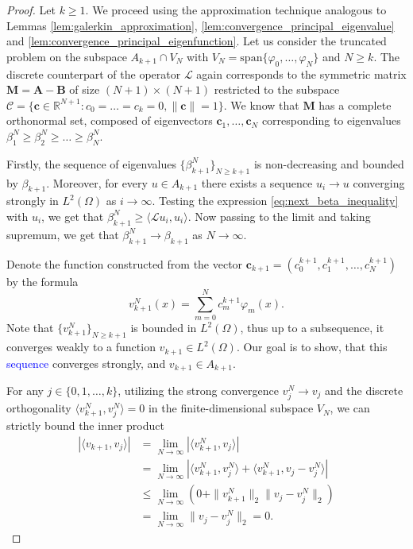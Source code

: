 \documentclass[12pt, a4paper]{article}
\newcommand{\revision}[1]{\textcolor{blue}{#1}}
\theoremstyle{break}
\theoremstyle{break}
\theoremstyle{break}
\theoremstyle{break}
\theoremstyle{break}
\theoremstyle{break}
\theoremstyle{break}
\theoremstyle{break}
\theoremstyle{break}
\begin{document}
\begin{proof}
    Let $k \geq 1$. We proceed using the approximation technique analogous to Lemmas \ref{lem:galerkin_approximation}, \ref{lem:convergence_principal_eigenvalue} and \ref{lem:convergence_principal_eigenfunction}. Let us consider the truncated problem on the subspace $A_{k+1} \cap V_N$ with $V_N = \text{span}\{\varphi_0, \ldots, \varphi_N\}$ and $N \geq k$. The discrete counterpart of the operator $\mathcal{L}$ again corresponds to the symmetric matrix $\mathbf{M} = \mathbf{A} - \mathbf{B}$ of size $(N+1) \times (N+1)$ restricted to the subspace $\mathcal{C} = \{ \mathbf{c} \in \mathbb{R}^{N+1} : c_0 = \ldots = c_k = 0, \|\mathbf{c}\| = 1\}$. We know that $\mathbf{M}$ has a complete orthonormal set, composed of eigenvectors $\mathbf{c}_1, \ldots, \mathbf{c}_N$ corresponding to eigenvalues $\beta_1^N \geq \beta_2^N \geq \ldots \geq \beta_N^N$. 

    Firstly, the sequence of eigenvalues $\{\beta_{k+1}^N\}_{N \geq k+1}$ is non-decreasing and bounded by $\beta_{k+1}$. Moreover, for every $u \in A_{k+1}$ there exists a sequence $u_i \rightarrow u$ converging strongly in $L^2(\Omega)$ as $i \rightarrow \infty$. Testing the expression \ref{eq:next_beta_inequality} with $u_i$, we get that $\beta_{k+1}^N \geq \langle \mathcal{L} u_i, u_i \rangle$. Now passing to the limit and taking supremum, we get that
    $\beta_{k+1}^N \rightarrow \beta_{k+1}$ as $N \rightarrow \infty$.
    
    Denote the function constructed from the vector $\mathbf{c}_{k+1} = (c_0^{k+1}, c_1^{k+1}, \ldots, c_N^{k+1})$ by the formula
    \begin{equation}
        v_{k+1}^N(x) = \sum_{m=0}^N c^{k+1}_m \varphi_m(x).
    \end{equation}
    Note that $\{v_{k+1}^N\}_{N \geq k+1}$ is bounded in $L^2(\Omega)$, thus up to a subsequence, it converges weakly to a function $v_{k+1} \in L^2(\Omega)$. Our goal is to show, that this \revision{sequence} converges strongly, and $v_{k+1} \in A_{k+1}$.

    For any $j \in \{0, 1, \ldots, k\}$, utilizing the strong convergence $v_j^N \to v_j$ and the discrete orthogonality $\langle v_{k+1}^N, v_j^N \rangle = 0$ in the finite-dimensional subspace $V_N$, we can strictly bound the inner product
    \begin{align}
        |\langle v_{k+1} , v_j \rangle| &= \lim_{N \rightarrow \infty} |\langle v_{k+1}^N, v_j \rangle| \nonumber \\
        &= \lim_{N \rightarrow \infty} |\langle v_{k+1}^N, v_j^N \rangle + \langle v_{k+1}^N, v_j - v_j^N \rangle| \nonumber \\
        &\leq \lim_{N \rightarrow \infty} \left( 0 + \|v_{k+1}^N\|_2 \|v_j - v_j^N\|_2 \right) \\
        &= \lim_{N \rightarrow \infty} \|v_j - v_j^N\|_2 = 0. \nonumber
    \end{align}
    

\end{proof}
\end{document}

